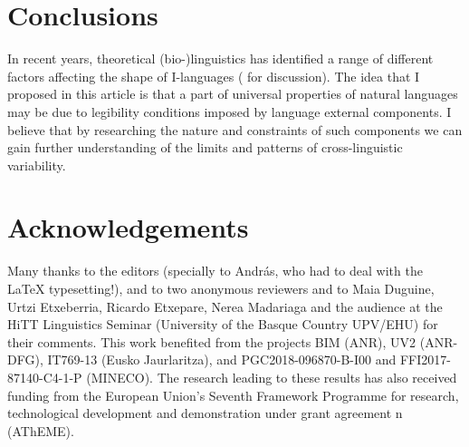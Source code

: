 \documentclass[output=paper]{langsci/langscibook}
\begin{document}
\section{Conclusions}

In recent years, theoretical (bio-)linguistics has identified a range of
different factors affecting the shape of I-languages
(\citealt{Chomsky2005,BerwickEtAl2011,Roberts2012} for discussion). The idea
that I proposed in this article is that a part of universal properties of
natural languages may be due to legibility conditions imposed by language
external components. I believe that by researching the nature and constraints of
such components we can gain further understanding of the limits and patterns of
cross-linguistic variability.

\printchapterglossary{}

\section*{Acknowledgements}

Many thanks to the editors (specially to András, who had to deal with the
\LaTeX{} typesetting!), and to two anonymous reviewers and to Maia Duguine,
Urtzi Etxeberria, Ricardo Etxepare, Nerea Madariaga and the audience at the
HiTT Linguistics Seminar (University of the Basque Country UPV/EHU) for their
comments. This work benefited from the projects BIM (ANR), UV2 (ANR-DFG),
IT769-13 (Eusko Jaurlaritza), and PGC2018-096870-B-I00 and FFI2017-87140-C4-1-P
(MINECO). The research leading to these results has also received funding from
the European Union’s Seventh Framework Programme for research, technological
development and demonstration under grant agreement n
(AThEME).

{\sloppy
\printbibliography[heading=subbibliography,notkeyword=this]
}
\end{document}
